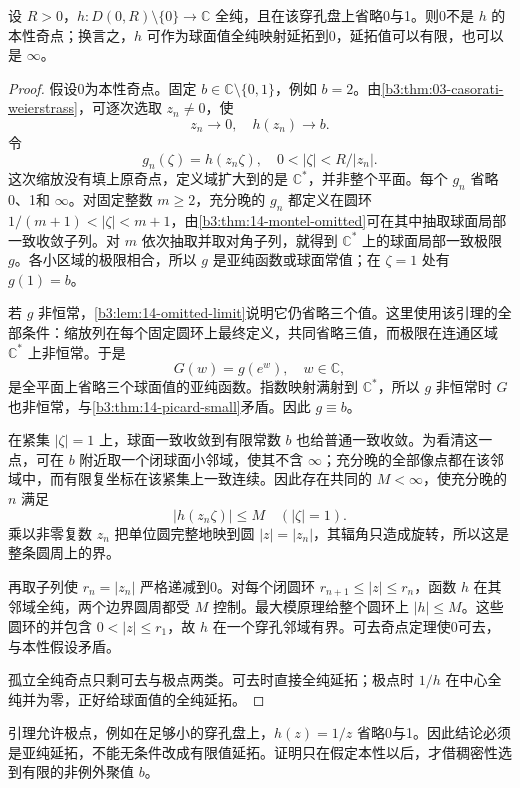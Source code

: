 \begin{lemma}[两个遗漏值强迫亚纯延拓]\label{b3:lem:14-two-omitted-puncture}
设 \(R>0\)，\(h:D(0,R)\setminus\{0\}\to\mathbb C\) 全纯，且在该穿孔盘上省略0与1。则0不是 \(h\) 的本性奇点；换言之，\(h\) 可作为球面值全纯映射延拓到0，延拓值可以有限，也可以是 \(\infty\)。
\end{lemma}
\begin{proof}
假设0为本性奇点。固定 \(b\in\mathbb C\setminus\{0,1\}\)，例如 \(b=2\)。由\cref{b3:thm:03-casorati-weierstrass}，可逐次选取 \(z_n\ne0\)，使
\[
 z_n\to0,\quad h(z_n)\to b.
\]
令
\[
 g_n(\zeta)=h(z_n\zeta),\quad
 0<|\zeta|<R/|z_n|.
\]
这次缩放没有填上原奇点，定义域扩大到的是 \(\mathbb C^*\)，并非整个平面。每个 \(g_n\) 省略0、1和 \(\infty\)。对固定整数 \(m\ge2\)，充分晚的 \(g_n\) 都定义在圆环 \(1/(m+1)<|\zeta|<m+1\)，由\cref{b3:thm:14-montel-omitted}可在其中抽取球面局部一致收敛子列。对 \(m\) 依次抽取并取对角子列，就得到 \(\mathbb C^*\) 上的球面局部一致极限 \(g\)。各小区域的极限相合，所以 \(g\) 是亚纯函数或球面常值；在 \(\zeta=1\) 处有 \(g(1)=b\)。

若 \(g\) 非恒常，\cref{b3:lem:14-omitted-limit}说明它仍省略三个值。这里使用该引理的全部条件：缩放列在每个固定圆环上最终定义，共同省略三值，而极限在连通区域 \(\mathbb C^*\) 上非恒常。于是
\[
 G(w)=g(e^w),\quad w\in\mathbb C,
\]
是全平面上省略三个球面值的亚纯函数。指数映射满射到 \(\mathbb C^*\)，所以 \(g\) 非恒常时 \(G\) 也非恒常，与\cref{b3:thm:14-picard-small}矛盾。因此 \(g\equiv b\)。

在紧集 \(|\zeta|=1\) 上，球面一致收敛到有限常数 \(b\) 也给普通一致收敛。为看清这一点，可在 \(b\) 附近取一个闭球面小邻域，使其不含 \(\infty\)；充分晚的全部像点都在该邻域中，而有限复坐标在该紧集上一致连续。因此存在共同的 \(M<\infty\)，使充分晚的 \(n\) 满足
\[
 |h(z_n\zeta)|\le M\quad(|\zeta|=1).
\]
乘以非零复数 \(z_n\) 把单位圆完整地映到圆 \(|z|=|z_n|\)，其辐角只造成旋转，所以这是整条圆周上的界。

再取子列使 \(r_n=|z_n|\) 严格递减到0。对每个闭圆环 \(r_{n+1}\le|z|\le r_n\)，函数 \(h\) 在其邻域全纯，两个边界圆周都受 \(M\) 控制。最大模原理给整个圆环上 \(|h|\le M\)。这些圆环的并包含 \(0<|z|\le r_1\)，故 \(h\) 在一个穿孔邻域有界。可去奇点定理使0可去，与本性假设矛盾。

孤立全纯奇点只剩可去与极点两类。可去时直接全纯延拓；极点时 \(1/h\) 在中心全纯并为零，正好给球面值的全纯延拓。
\end{proof}
引理允许极点，例如在足够小的穿孔盘上，\(h(z)=1/z\) 省略0与1。因此结论必须是亚纯延拓，不能无条件改成有限值延拓。证明只在假定本性以后，才借稠密性选到有限的非例外聚值 \(b\)。

